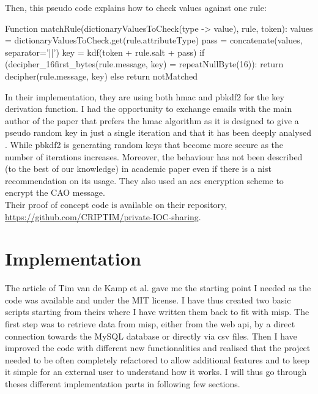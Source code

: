 \documentclass{eplmastersthesis}
\begin{document}
Then, this pseudo code explains how to check values against one rule:
\begin{center}
\begin{boxedverbatim}
Function matchRule(dictionaryValuesToCheck(type -> value), rule, token):
		values = dictionaryValuesToCheck.get(rule.attributeType)
        pass = concatenate(values, separator='||')
        key = kdf(token + rule.salt + pass)
        if (decipher_16first_bytes(rule.message, key) = repeatNullByte(16)):
                return decipher(rule.message, key)
        else
                return notMatched
\end{boxedverbatim}
\end{center}


In their implementation, they are using both \gls{hmac} and \gls{pbkdf2} for the key derivation function. I had the opportunity to exchange emails with the main author of the paper that prefers the \gls{hmac} algorithm as it is designed to give a pseudo random key in just a single iteration and that it has been deeply analysed \cite{cryptoeprint}. While \gls{pbkdf2} is generating random keys that become more secure as the number of iterations increases. Moreover, the behaviour has not been described (to the best of our knowledge) in academic paper even if there is a \gls{nist} recommendation on its usage.
They also used an \gls{aes} encryption scheme to encrypt the CAO message.\\

Their proof of concept code is available on their repository, \url{https://github.com/CRIPTIM/private-IOC-sharing}. 




\chapter{Implementation}
\label{chap:Implementation}

The article of Tim van de Kamp et al. gave me the starting point I needed as the code was available and under the MIT license. I have thus created two basic scripts starting from theirs where I have written them back to fit with \gls{misp}.
The first step was to retrieve data from \gls{misp}, either from the web \gls{api}, by a direct connection towards the MySQL database or directly via \gls{csv} files.
Then I have improved the code with different new functionalities and realised that the project needed to be often completely refactored to allow additional features and to keep it simple for an external user to understand how it works. I will thus go through theses different implementation parts in following few sections.\\
\end{document}
